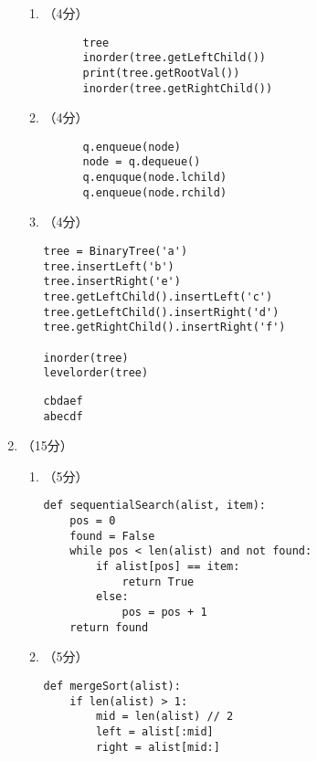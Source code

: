 \documentclass[8pt]{article}
\newlength{\lc}
\newlength{\ld}
\begin{document}
\begin{CJK}{UTF8}{gkai}
\begin{enumerate}
\begin{enumerate}
  \item （4分）
    \begin{lstlisting}
      tree
      inorder(tree.getLeftChild())
      print(tree.getRootVal())
      inorder(tree.getRightChild())
    \end{lstlisting}
  \item （4分）
    \begin{lstlisting}      
      q.enqueue(node)
      node = q.dequeue()
      q.enquque(node.lchild)
      q.enqueue(node.rchild)    
    \end{lstlisting}
  \item （4分）
    \begin{figure}[htbp]
      \centering
  \end{figure}
  \begin{lstlisting}
tree = BinaryTree('a')
tree.insertLeft('b')
tree.insertRight('e')   
tree.getLeftChild().insertLeft('c')
tree.getLeftChild().insertRight('d')
tree.getRightChild().insertRight('f')

inorder(tree)
levelorder(tree)
\end{lstlisting}

\begin{lstlisting}[title=运行结果]
cbdaef
abecdf
\end{lstlisting}
  \end{enumerate}
\item （15分）~ 
  \begin{enumerate}
  \item （5分）~
    \begin{lstlisting}
def sequentialSearch(alist, item):
    pos = 0
    found = False
    while pos < len(alist) and not found:
        if alist[pos] == item:
            return True
        else:
            pos = pos + 1
    return found
    \end{lstlisting}
  \item （5分）~
    \begin{lstlisting}
def mergeSort(alist):
    if len(alist) > 1:
        mid = len(alist) // 2
        left = alist[:mid]
        right = alist[mid:]


\end{lstlisting}
\end{enumerate}
\end{enumerate}
\end{CJK}
\end{document}
